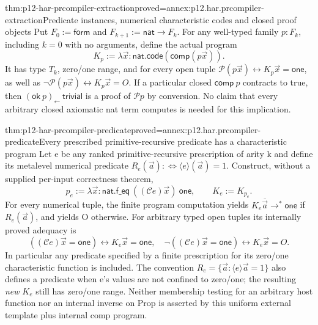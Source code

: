 \begin{hbtheorem}{thm:p12-har-prcompiler-extraction}{proved=annex:p12.har.prcompiler-extraction}{Predicate instances, numerical characteristic codes and closed proof objects}
Put \(F_0:=\mathsf{form}\) and \(F_{k+1}:=\mathsf{nat}\to F_k\).
For any well-typed family \(p:F_k\),
including \(k=0\) with no arguments, define the actual program
\[
 K_p:=\lambda\vec x:\mathsf{nat}.
           \mathsf{code}(\mathsf{comp}(p\vec x)).
\]
It has type \(T_k\), zero/one range, and for every open tuple
\(\mathcal P(p\vec x)\leftrightarrow K_p\vec x=\mathsf{one}\),
as well as \(\neg\mathcal P(p\vec x)\leftrightarrow K_p\vec x=O\).
If a particular closed \(\mathsf{comp}\ p\) contracts to true, then
\((\mathsf{ok}\ p)_{\leftarrow}\ \mathsf{trivial}\) is a proof of
\(\mathcal P p\) by conversion. No claim that every arbitrary closed
axiomatic nat term computes is needed for this implication.
\end{hbtheorem}

\begin{hbtheorem}{thm:p12-har-prcompiler-predicate}{proved=annex:p12.har.prcompiler-predicate}{Every prescribed primitive-recursive predicate has a characteristic program}
Let e be any ranked primitive-recursive prescription of arity k and
define its metalevel numerical predicate
\(R_e(\vec a):\!\iff\langle e\rangle(\vec a)=1\).
Construct, without a supplied per-input correctness theorem,
\[
 p_e:=\lambda\vec x:\mathsf{nat}.
          \mathsf{f\_eq}\ ((\mathcal C e)\vec x)\ \mathsf{one},
 \qquad K_e:=K_{p_e}.
\]
For every numerical tuple, the finite program computation yields
\(K_e\overline{\vec a}\longrightarrow^*\mathsf{one}\) if
\(R_e(\vec a)\), and yields O otherwise. For arbitrary typed open
tuples its internally proved adequacy is
\[
 ((\mathcal C e)\vec x=\mathsf{one})
                 \leftrightarrow K_e\vec x=\mathsf{one},
 \quad
 \neg((\mathcal C e)\vec x=\mathsf{one})
                 \leftrightarrow K_e\vec x=O.
\]
In particular any predicate specified by a finite prescription for
its zero/one characteristic function is included. The convention
\(R_e=\{\vec a:\langle e\rangle\vec a=1\}\) also defines a
predicate when e's values are not confined to zero/one; the resulting
\emph{new} \(K_e\) still has zero/one range. Neither membership testing
for an arbitrary host function nor an internal inverse on Prop is
asserted by this uniform external template plus internal comp program.
\end{hbtheorem}


